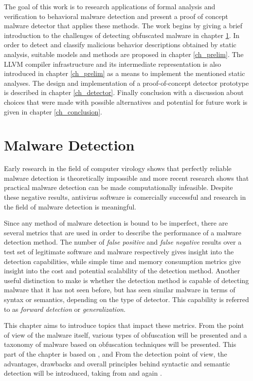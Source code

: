 The goal of this work is to research applications of formal analysis and verification to behavioral malware detection and present a proof of concept malware detector that applies these methods. The work begins by giving a brief introduction to the challenges of detecting obfuscated malware in chapter \ref{ch_malware}. In order to detect and classify malicious behavior descriptions obtained by static analysis, suitable models and methods are proposed in chapter \ref{ch_prelim}. The {LLVM} compiler infrastructure and its intermediate representation is also introduced in chapter \ref{ch_prelim} as a means to implement the mentioned static analyses. The design and implementation of a proof-of-concept detector prototype is described in chapter \ref{ch_detector}. Finally conclusion with a discussion about choices that were made with possible alternatives and potential for future work is given in chapter \ref{ch_conclusion}.

\chapter{Malware Detection}
\label{ch_malware}
Early research in the field of computer virology shows that perfectly reliable malware detection is theoretically impossible\cite{Cohen86} and more recent research shows that practical malware detection can be made computationally infeasible\cite{Filiol12}. Despite these negative results, antivirus software is comercially successful and research in the field of malware detection is meaningful.

Since any method of malware detection is bound to be imperfect, there are several metrics that are used in order to describe the performance of a malware detection method. The number of \emph{false positive} and \emph{false negative} results over a test set of legitimate software and malware respectively gives insight into the detection capabilities, while simple time and memory consumption metrics give insight into the cost and potential scalability of the detection method. Another useful distinction to make is whether the detection method is capable of detecting malware that it has not seen before, but has seen similar malware in terms of syntax or semantics, depending on the type of detector. This capability is referred to as \emph{forward detection}\cite{Christo07} or \emph{generalization}\cite{Babic11}.

This chapter aims to introduce topics that impact these metrics. From the point of view of the malware itself, various types of obfuscation will be presented and a taxonomy of malware based on obfuscation techniques will be presented. This part of the chapter is based on \cite{You10}, \cite{Shiffman10} and \cite{Szor05} From the detection point of view, the advantages, drawbacks and overall principles behind syntactic and semantic detection will be introduced, taking from \cite{Jacob08} and again \cite{Szor05}.

